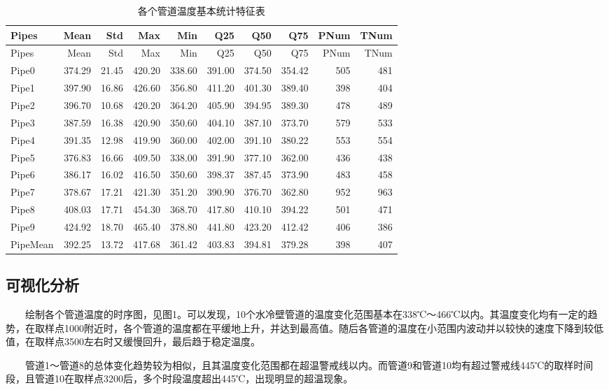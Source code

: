 \documentclass[
]{article}
\begin{document}
\begin{longtable}[]{@{}lrrrrrrrrr@{}}
\caption{各个管道温度基本统计特征表}\tabularnewline
\toprule
Pipes & Mean & Std & Max & Min & Q25 & Q50 & Q75 & PNum &
TNum\tabularnewline
\midrule
\endfirsthead
\toprule
Pipes & Mean & Std & Max & Min & Q25 & Q50 & Q75 & PNum &
TNum\tabularnewline
\midrule
\endhead
Pipe0 & 374.29 & 21.45 & 420.20 & 338.60 & 391.00 & 374.50 & 354.42 &
505 & 481\tabularnewline
Pipe1 & 397.90 & 16.86 & 426.60 & 356.80 & 411.20 & 401.30 & 389.40 &
398 & 404\tabularnewline
Pipe2 & 396.70 & 10.68 & 420.20 & 364.20 & 405.90 & 394.95 & 389.30 &
478 & 489\tabularnewline
Pipe3 & 387.59 & 16.38 & 420.90 & 350.60 & 404.10 & 387.10 & 373.70 &
579 & 533\tabularnewline
Pipe4 & 391.35 & 12.98 & 419.90 & 360.00 & 402.00 & 391.10 & 380.22 &
553 & 554\tabularnewline
Pipe5 & 376.83 & 16.66 & 409.50 & 338.00 & 391.90 & 377.10 & 362.00 &
436 & 438\tabularnewline
Pipe6 & 386.17 & 16.02 & 416.50 & 350.60 & 398.37 & 387.45 & 373.90 &
483 & 458\tabularnewline
Pipe7 & 378.67 & 17.21 & 421.30 & 351.20 & 390.90 & 376.70 & 362.80 &
952 & 963\tabularnewline
Pipe8 & 408.03 & 17.71 & 454.30 & 368.70 & 417.80 & 410.10 & 394.22 &
501 & 471\tabularnewline
Pipe9 & 424.92 & 18.70 & 465.40 & 378.80 & 441.80 & 423.20 & 412.42 &
406 & 386\tabularnewline
PipeMean & 392.25 & 13.72 & 417.68 & 361.42 & 403.83 & 394.81 & 379.28 &
398 & 407\tabularnewline
\bottomrule
\end{longtable}

\hypertarget{ux53efux89c6ux5316ux5206ux6790}{%
\subsection{可视化分析}\label{ux53efux89c6ux5316ux5206ux6790}}

  绘制各个管道温度的时序图，见图1。可以发现，10个水冷壁管道的温度变化范围基本在338℃～466℃以内。其温度变化均有一定的趋势，在取样点1000附近时，各个管道的温度都在平缓地上升，并达到最高值。随后各管道的温度在小范围内波动并以较快的速度下降到较低值，在取样点3500左右时又缓慢回升，最后趋于稳定温度。

  管道1～管道8的总体变化趋势较为相似，且其温度变化范围都在超温警戒线以内。而管道9和管道10均有超过警戒线445℃的取样时间段，且管道10在取样点3200后，多个时段温度超出445℃，出现明显的超温现象。
\end{document}
